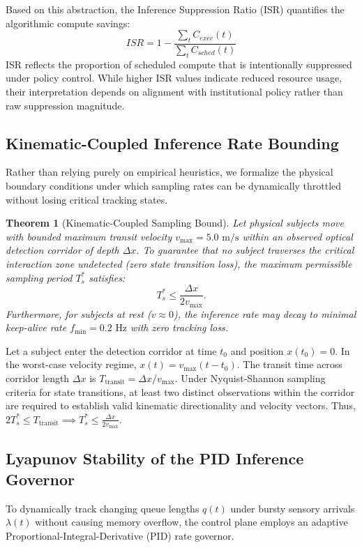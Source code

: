 \documentclass[conference]{IEEEtran}
\newtheorem{theorem}{Theorem}
\begin{document}
Based on this abstraction, the Inference Suppression Ratio (ISR) quantifies the algorithmic compute savings:
\begin{equation}
ISR = 1 - \frac{\sum_t C_{exec}(t)}{\sum_t C_{sched}(t)}
\end{equation}
ISR reflects the proportion of scheduled compute that is intentionally suppressed under policy control. While higher ISR values indicate reduced resource usage, their interpretation depends on alignment with institutional policy rather than raw suppression magnitude.

\subsection{Kinematic-Coupled Inference Rate Bounding}
Rather than relying purely on empirical heuristics, we formalize the physical boundary conditions under which sampling rates can be dynamically throttled without losing critical tracking states.

\begin{theorem}[Kinematic-Coupled Sampling Bound]
Let physical subjects move with bounded maximum transit velocity $v_{\max} = 5.0\text{ m/s}$ within an observed optical detection corridor of depth $\Delta x$. To guarantee that no subject traverses the critical interaction zone undetected (zero state transition loss), the maximum permissible sampling period $T_s^*$ satisfies:
\begin{equation}
T_s^* \le \frac{\Delta x}{2 v_{\max}}.
\label{eq:kinematic_bound}
\end{equation}
Furthermore, for subjects at rest ($v \approx 0$), the inference rate may decay to minimal keep-alive rate $f_{\min} = 0.2\text{ Hz}$ with zero tracking loss.
\end{theorem}

\begin{IEEEproof}
Let a subject enter the detection corridor at time $t_0$ and position $x(t_0) = 0$. In the worst-case velocity regime, $x(t) = v_{\max} (t - t_0)$. The transit time across corridor length $\Delta x$ is $T_{\text{transit}} = \Delta x / v_{\max}$. Under Nyquist-Shannon sampling criteria for state transitions, at least two distinct observations within the corridor are required to establish valid kinematic directionality and velocity vectors. Thus, $2 T_s^* \le T_{\text{transit}} \implies T_s^* \le \frac{\Delta x}{2 v_{\max}}$.
\end{IEEEproof}

\subsection{Lyapunov Stability of the PID Inference Governor}
To dynamically track changing queue lengths $q(t)$ under bursty sensory arrivals $\lambda(t)$ without causing memory overflow, the control plane employs an adaptive Proportional-Integral-Derivative (PID) rate governor.
\end{document}
